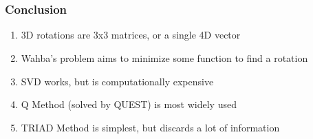 \documentclass[11pt]{beamer}
\begin{document}
    \section{}

    \section*{}
    \begin{frame}
        \frametitle{Conclusion}
        \begin{enumerate}[<+->]
            \item 3D rotations are 3x3 matrices, or a single 4D vector \medskip
            \item Wahba's problem aims to minimize some function to find a rotation \medskip
            \item SVD works, but is computationally expensive \medskip
            \item Q Method (solved by QUEST) is most widely used \medskip
            \item TRIAD Method is simplest, but discards a lot of information
        \end{enumerate}
    \end{frame}

    \begin{frame}
    \end{frame}
\end{document}
